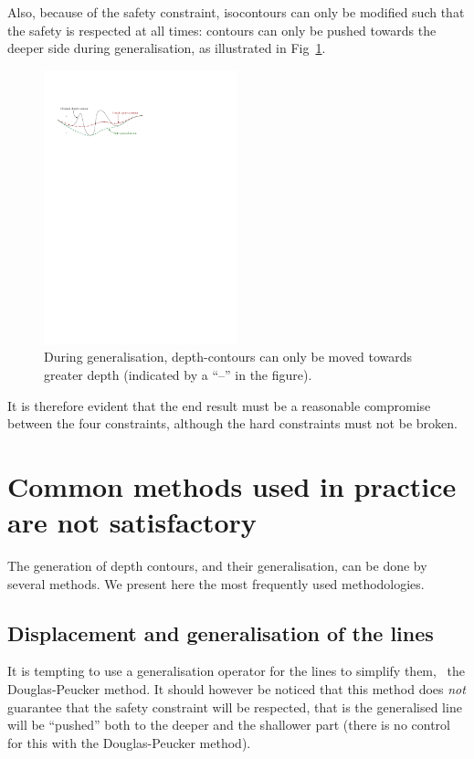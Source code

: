 Also, because of the safety constraint, isocontours can only be modified such that the safety is respected at all times: contours can only be pushed towards the deeper side during generalisation, as illustrated in Fig~\ref{fig:genvalidornot}. 
\begin{figure}
  \centering
  \includegraphics[width=0.5\textwidth]{figs/genvalidornot}
  \caption{During generalisation, depth-contours can only be moved towards greater depth (indicated by a ``--'' in the figure).}
\label{fig:genvalidornot}
\end{figure}
It is therefore evident that the end result must be a reasonable compromise between the four constraints, although the hard constraints must not be broken.


\section{Common methods used in practice are not satisfactory}

The generation of depth contours, and their generalisation, can be done by several methods.
We present here the most frequently used methodologies.


\subsection{Displacement and generalisation of the lines}

It is tempting to use a generalisation operator for the lines to simplify them, \eg\ the Douglas-Peucker method.
It should however be noticed that this method does \emph{not} guarantee that the safety constraint will be respected, that is the generalised line will be ``pushed'' both to the deeper and the shallower part (there is no control for this with the Douglas-Peucker method).

